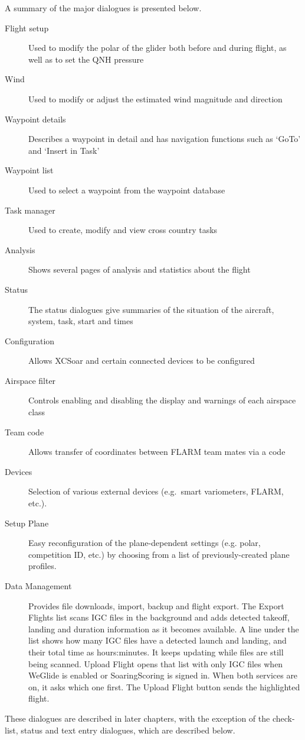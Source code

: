 A summary of the major dialogues is presented below.
\begin{description}
\item[Flight setup] Used to modify the polar of the glider both before and
during flight, as well as to set the QNH pressure
\item[Wind] Used to modify or adjust the estimated wind magnitude and direction
\item[Waypoint details] Describes a waypoint in detail and has navigation
functions such as `GoTo' and `Insert in Task'
\item[Waypoint list] Used to select a waypoint from the waypoint database
\item[Task manager] Used to create, modify and view cross country tasks
\item[Analysis] Shows several pages of analysis and statistics about the flight
\item[Status] The status dialogues give summaries of the situation of the 
aircraft, system, task, start and times
\item[Configuration] Allows XCSoar and certain connected devices to be
configured
\item[Airspace filter] Controls enabling and disabling the display and warnings
of each airspace class
\item[Team code] Allows transfer of coordinates between FLARM team mates via a 
  code
\item[Devices]  Selection of various external devices (e.g.\ smart variometers,
  FLARM, etc.).
\item[Setup Plane]  Easy reconfiguration of the plane-dependent settings (e.g. 
  polar, competition ID, etc.) by choosing from a list of previously-created 
  plane profiles.
\item[Data Management] Provides file downloads, import, backup and flight
  export.  The Export Flights list scans IGC files in the background and adds
  detected takeoff, landing and duration information as it becomes available.
  A line under the list shows how many IGC files have a detected launch and
  landing, and their total time as hours:minutes. It keeps updating while
  files are still being scanned.
  Upload Flight opens that list with only IGC files when WeGlide is
  enabled or SoaringScoring is signed in. When both services are on,
  it asks which one first. The Upload Flight button sends the
  highlighted flight.
\end{description}

These dialogues are described in later chapters, with the exception of the
check-list, status and text entry dialogues, which are described below.


